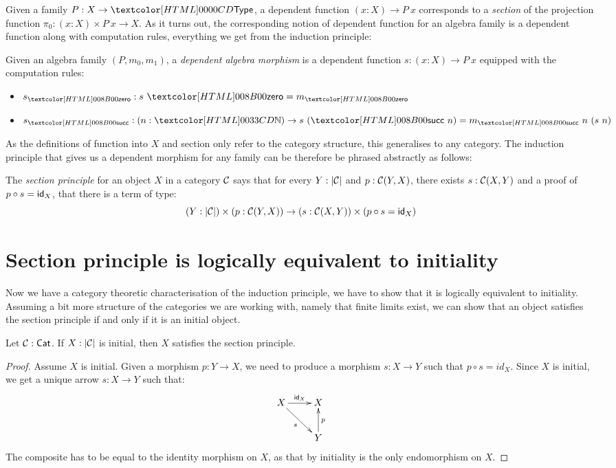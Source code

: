 Given a family $P : X \to \Type$, a dependent function
$(x : X) \to P\ x$ corresponds to a \emph{section} of the projection
function $\pi_0 : (x : X) \times P\ x \to X$. As it turns out, the
corresponding notion of dependent function for an algebra family is a
dependent function along with computation rules, \ie everything we get
from the induction principle:

\begin{definition}
  Given an algebra family $(P,m_0,m_1)$, a \emph{dependent algebra
    morphism} is a dependent function $s : (x : X) \to P\ x$ equipped
  with the computation rules:
  \begin{itemize}
  \item $s_{\natzero} : s\ \natzero = m_{\natzero}$
  \item $s_{\natsucc} : (n : \natty) \to s\ (\natsucc\ n) = m_{\natsucc}\ n\ (s\ n)$
  \end{itemize}
\end{definition}

As the definitions of function into $X$ and section only refer to the
category structure, this generalises to any category. The induction
principle that gives us a dependent morphism for any family can be
therefore be phrased abstractly as follows:

\begin{definition}
  The \emph{section principle} for an object $X$ in a category $\mathcal{C}$
  says that for every $Y : | \mathcal{C} |$ and $p : \mathcal{C}(Y,X)$, there exists
  $s : \mathcal{C}(X,Y)$ and a proof of $p \circ s = \mathsf{id}_X$, \ie that there is
  a term of type:
  \[
    (Y : | \mathcal{C} |) \times (p : \mathcal{C}(Y,X)) \to (s : \mathcal{C}(X,Y)) \times (p \circ s = \mathsf{id}_X)
  \]
\end{definition}

\section{Section principle is logically equivalent to initiality}

Now we have a category theoretic characterisation of the induction
principle, we have to show that it is logically equivalent to
initiality. Assuming a bit more structure of the categories we are
working with, namely that finite limits exist, we can show that an
object satisfies the section principle if and only if it is an initial
object.

\begin{lemma}
  \label{initiality-to-section}
  Let $\mathcal{C}: \mathsf{Cat}$. If $X : | \mathcal{C} |$ is initial, then $X$ satisfies the
  section principle.
\end{lemma}
\begin{proof}
  Assume $X$ is initial. Given a morphism $p : Y \to X$, we need to
  produce a morphism $s : X \to Y$ such that $p \circ s = id_X$.
  Since $X$ is initial, we get a unique arrow $s : X \to Y$ such that:
  $$
  \xymatrix{
    X \ar[r]^{\id_{X}} \ar[rd]_{s} &X \\
    &Y \ar[u]_{p}
  }
  $$
  The composite has to be equal to the identity morphism on $X$, as
  that by initiality is the only endomorphism on $X$.
\end{proof}

